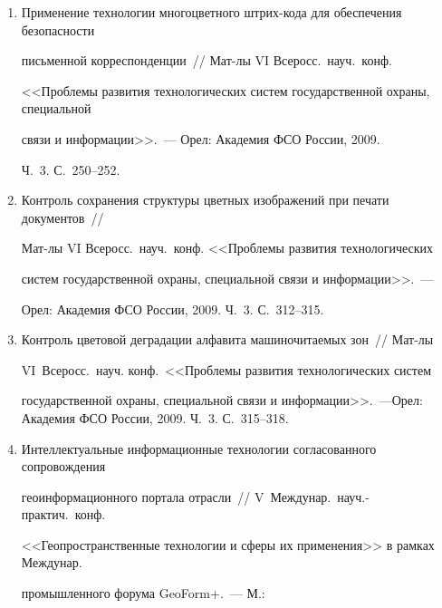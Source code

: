 \begin{enumerate}[1.]


\item {}


Применение технологии многоцветного штрих-кода для обеспечения безопасности 


письменной корреспонденции~// Мат-лы VI Всеросс.\ науч.\ конф.\


<<Проблемы развития технологических систем государственной охраны, специальной 


связи и информации>>.~--- Орел: Академия ФСО России, 2009. 


Ч.~3. С.~250--252.





\item {}


Контроль сохранения структуры цветных изображений при печати документов~// 


Мат-лы VI Всеросс.\ науч.\ конф. <<Проблемы развития технологических 


систем государственной охраны, специальной связи и информации>>.~--- 


Орел: Академия ФСО России, 2009. Ч.~3. С.~312--315.





\item {}


Контроль цветовой деградации алфавита машиночитаемых зон~// Мат-лы 


VI~Всеросс.\ науч. конф.\ <<Проблемы развития технологических систем 


государственной охраны, специальной связи и информации>>.~---\linebreak Орел: Академия ФСО России, 2009. Ч.~3. С.~315--318.





\item {}


Интеллектуальные информационные технологии согласованного сопровождения 


геоинформационного портала отрасли~// V~Междунар.\ науч.-практич.\ конф.\ 


<<Геопространственные технологии и сферы их применения>> в рамках Междунар.\ 


промышленного форума GeoForm+.~--- М.: 



\end{enumerate}
